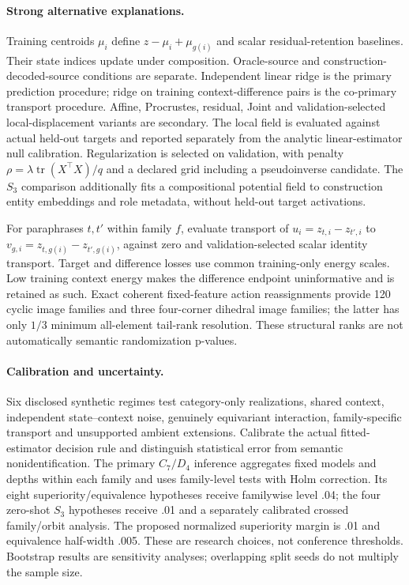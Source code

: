 \paragraph{Strong alternative explanations.}
Training centroids $\mu_i$ define $z-\mu_i+\mu_{g(i)}$ and scalar residual-retention baselines. Their state indices update under composition. Oracle-source and construction-decoded-source conditions are separate. Independent linear ridge is the primary prediction procedure; ridge on training context-difference pairs is the co-primary transport procedure. Affine, Procrustes, residual, Joint and validation-selected local-displacement variants are secondary. The local field is evaluated against actual held-out targets and reported separately from the analytic linear-estimator null calibration. Regularization is selected on validation, with penalty $\rho=\lambda\operatorname{tr}(X^\top X)/q$ and a declared grid including a pseudoinverse candidate. The $S_3$ comparison additionally fits a compositional potential field to construction entity embeddings and role metadata, without held-out target activations.

For paraphrases $t,t'$ within family $f$, evaluate transport of $u_i=z_{t,i}-z_{t',i}$ to $v_{g,i}=z_{t,g(i)}-z_{t',g(i)}$, against zero and validation-selected scalar identity transport. Target and difference losses use common training-only energy scales. Low training context energy makes the difference endpoint uninformative and is retained as such. Exact coherent fixed-feature action reassignments provide 120 cyclic image families and three four-corner dihedral image families; the latter has only $1/3$ minimum all-element tail-rank resolution. These structural ranks are not automatically semantic randomization p-values.

\paragraph{Calibration and uncertainty.}
Six disclosed synthetic regimes test category-only realizations, shared context, independent state--context noise, genuinely equivariant interaction, family-specific transport and unsupported ambient extensions. Calibrate the actual fitted-estimator decision rule and distinguish statistical error from semantic nonidentification. The primary $C_7/D_4$ inference aggregates fixed models and depths within each family and uses family-level tests with Holm correction. Its eight superiority/equivalence hypotheses receive familywise level .04; the four zero-shot $S_3$ hypotheses receive .01 and a separately calibrated crossed family/orbit analysis. The proposed normalized superiority margin is .01 and equivalence half-width .005. These are research choices, not conference thresholds. Bootstrap results are sensitivity analyses; overlapping split seeds do not multiply the sample size.

